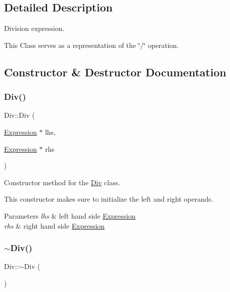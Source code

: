 \subsection{Detailed Description}
Division expression. 

This Class serves as a representation of the \char`\"{}/\char`\"{} operation. 

\subsection{Constructor \& Destructor Documentation}
\mbox{\label{class_div_a09066be0ef1596f1f673fe7a072cdc2d}} 
\subsubsection{\texorpdfstring{Div()}{Div()}}
{\footnotesize\ttfamily Div\+::\+Div (\begin{DoxyParamCaption}\item[{\hyperlink{class_expression}{Expression} $\ast$}]{lhs,  }\item[{\hyperlink{class_expression}{Expression} $\ast$}]{rhs }\end{DoxyParamCaption})}



Constructor method for the \hyperlink{class_div}{Div} class. 

This constructor makes sure to initialize the left and right operands.


\begin{DoxyParams}{Parameters}
{\em lhs} & left hand side \hyperlink{class_expression}{Expression} \\
\hline
{\em rhs} & right hand side \hyperlink{class_expression}{Expression} \\
\hline
\end{DoxyParams}
\mbox{\label{class_div_ad4e297304eb13dfd034c9e0459ecfc4d}} 
\subsubsection{\texorpdfstring{$\sim$\+Div()}{~Div()}}
{\footnotesize\ttfamily Div\+::$\sim$\+Div (\begin{DoxyParamCaption}{ }\end{DoxyParamCaption})}



